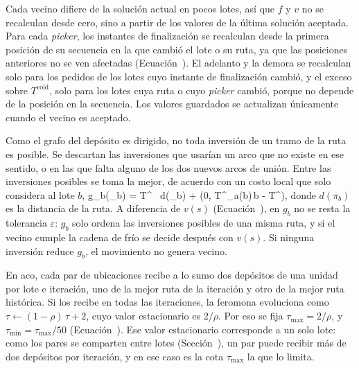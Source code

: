 Cada vecino difiere de la solución actual en pocos lotes, así que $f$ y $v$
no se recalculan desde cero, sino a partir de los valores de la última
solución aceptada. Para cada {\em picker}, los instantes de finalización se
recalculan desde la primera posición de su secuencia en la que cambió el lote
o su ruta, ya que las posiciones anteriores no se ven afectadas
(Ecuación~\in[eq:hc_finalizacion]). El adelanto y la demora se recalculan
solo para los pedidos de los lotes cuyo instante de finalización cambió, y el
exceso sobre $T^{\text{cold}}$, solo para los lotes cuya ruta o cuyo
{\em picker} cambió, porque no depende de la posición en la secuencia. Los
valores guardados se actualizan únicamente cuando el vecino es aceptado.

\stopsubsection

\startsubsection[title={Movimiento 2-opt de \ac{hc}}, reference=sec:anexo_2opt]

Como el grafo del depósito es dirigido, no toda inversión de un tramo de la
ruta es posible. Se descartan las inversiones que usarían un arco que no
existe en ese sentido, o en las que falta alguno de los dos nuevos arcos de
unión. Entre
las inversiones posibles se toma la mejor, de acuerdo con un costo local que
solo considera al lote $b$,
\startplaceformula[reference=eq:hc_costo_local]
\startformula
	g_b(\pi_b) = T^{} \, d(\pi_b) + \lambda \max\left(0,\; T^{}_{a(b)\,b} - T^{}\right),
\stopformula
\stopplaceformula
donde $d(\pi_b)$ es la distancia de la ruta. A diferencia de $v(s)$
(Ecuación~\in[eq:hc_violacion]), en $g_b$ no se resta la tolerancia
$\varepsilon$: $g_b$ solo ordena las inversiones posibles de una misma ruta,
y si el vecino cumple la cadena de frío se decide después con $v(s)$. Si
ninguna inversión reduce $g_b$, el movimiento no genera vecino.

\stopsubsection

\startsubsection[title={Cotas de la feromona de ruta}, reference=sec:anexo_cotas]

En \ac{aco}, cada par de ubicaciones recibe a lo sumo dos depósitos de una
unidad por lote e iteración, uno de la mejor ruta de la iteración y otro de
la mejor ruta histórica. Si los recibe en todas las iteraciones, la feromona
evoluciona como $\tau \leftarrow (1-\rho)\,\tau + 2$, cuyo valor estacionario
es $2 / \rho$. Por eso se fija $\tau_{\max} = 2/\rho$, y
$\tau_{\min} = \tau_{\max}/50$ (Ecuación~). Ese valor
estacionario corresponde a un solo lote: como los pares se comparten entre
lotes (Sección~), un par puede recibir más de dos
depósitos por iteración, y en ese caso es la cota $\tau_{\max}$ la que lo
limita.


